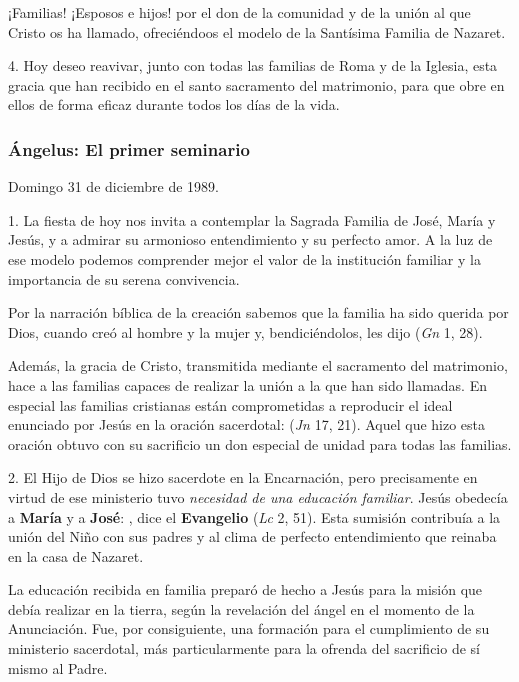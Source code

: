¡Familias! ¡Esposos e hijos!  por el don de la comunidad y de la unión al que Cristo os ha llamado, ofreciéndoos el modelo de la Santísima Familia de Nazaret.

4. Hoy deseo reavivar, junto con todas las familias de Roma y de la Iglesia, esta gracia que han recibido en el santo sacramento del matrimonio, para que obre en ellos de forma eficaz durante todos los días de la vida.

\subsubsection{Ángelus: El primer seminario}

Domingo 31 de diciembre de 1989.

1. La fiesta de hoy nos invita a contemplar la Sagrada Familia de José, María y Jesús, y a admirar su armonioso entendimiento y su perfecto amor. A la luz de ese modelo podemos comprender mejor el valor de la institución familiar y la importancia de su serena convivencia.

Por la narración bíblica de la creación sabemos que la familia ha sido querida por Dios, cuando creó al hombre y la mujer y, bendiciéndolos, les dijo  (\emph{Gn} 1, 28).

Además, la gracia de Cristo, transmitida mediante el sacramento del matrimonio, hace a las familias capaces de realizar la unión a la que han sido llamadas. En especial las familias cristianas están comprometidas a reproducir el ideal enunciado por Jesús en la oración sacerdotal:  (\emph{Jn} 17, 21). Aquel que hizo esta oración obtuvo con su sacrificio un don especial de unidad para todas las familias.

2. El Hijo de Dios se hizo sacerdote en la Encarnación, pero precisamente en virtud de ese ministerio tuvo \emph{necesidad de una educación familiar}. Jesús obedecía a \textbf{María} y a \textbf{José}: , dice el \textbf{Evangelio} (\emph{Lc} 2, 51). Esta sumisión contribuía a la unión del Niño con sus padres y al clima de perfecto entendimiento que reinaba en la casa de Nazaret.

La educación recibida en familia preparó de hecho a Jesús para la misión que debía realizar en la tierra, según la revelación del ángel en el momento de la Anunciación. Fue, por consiguiente, una formación para el cumplimiento de su ministerio sacerdotal, más particularmente para la ofrenda del sacrificio de sí mismo al Padre.

